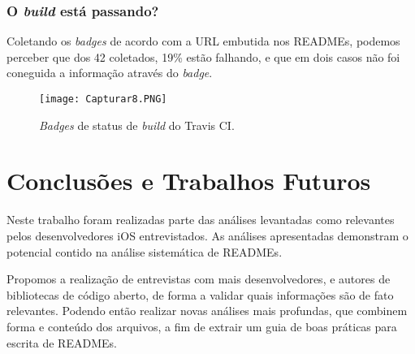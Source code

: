 \documentclass[preprint,12pt,authoryear]{elsarticle}
\begin{document}
\subsubsection{O \textit{build} está passando?}
Coletando os \textit{badges} de acordo com a URL embutida nos READMEs, podemos perceber que dos 42 coletados, 19\% estão falhando, e que em dois casos não foi coneguida a informação através do \textit{badge}.

\begin{figure}[!htb]
\centering
\texttt{[image: Capturar8.PNG]}
\caption{\textit{Badges} de status de \textit{build} do Travis CI.}
\end{figure}

\section{Conclusões e Trabalhos Futuros}
Neste trabalho foram realizadas parte das análises levantadas como relevantes pelos desenvolvedores iOS entrevistados. As análises apresentadas demonstram o potencial contido na análise sistemática de READMEs.

Propomos a realização de entrevistas com mais desenvolvedores, e autores de bibliotecas de código aberto, de forma a validar quais informações são de fato relevantes. Podendo então realizar novas análises mais profundas, que combinem forma e conteúdo dos arquivos, a fim de extrair um guia de boas práticas para escrita de READMEs.





\begin{thebibliography}{00}


\bibitem[ ()]{}

\end{thebibliography}
\end{document}
